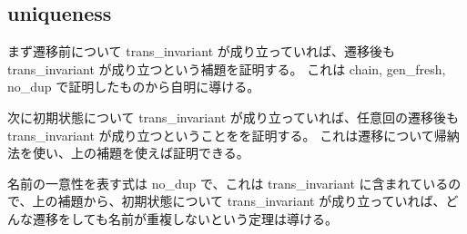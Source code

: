 \subsection{uniqueness}
まず遷移前について trans\_invariant が成り立っていれば、遷移後も trans\_invariant が成り立つという補題を証明する。
これは chain, gen\_fresh, no\_dup で証明したものから自明に導ける。

次に初期状態について trans\_invariant が成り立っていれば、任意回の遷移後も trans\_invariant が成り立つということをを証明する。
これは遷移について帰納法を使い、上の補題を使えば証明できる。

名前の一意性を表す式は no\_dup で、これは trans\_invariant に含まれているので、上の補題から、初期状態について trans\_invariant が成り立っていれば、どんな遷移をしても名前が重複しないという定理は導ける。
